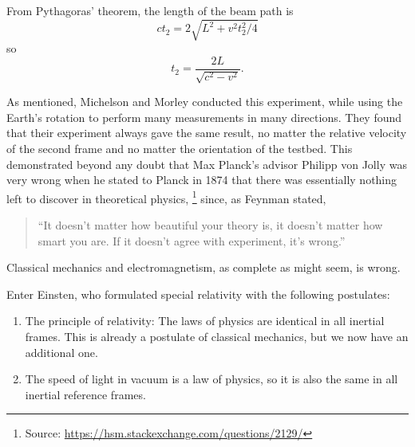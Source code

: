 From Pythagoras' theorem, the length of the beam path is
\[
  c t_2 = 2 \sqrt{L^2 + v^2 t_2^2 / 4}
\]
so
\[
  t_2 = \frac{2 L}{\sqrt{c^2 - v^2}}.
\]

As mentioned, Michelson and Morley conducted this experiment, while using the
Earth's rotation to perform many measurements in many directions.
They found that their experiment always gave the same result, no matter the
relative velocity of the second frame and no matter the orientation of the
testbed.
This demonstrated beyond any doubt that Max Planck's advisor Philipp von Jolly
was very wrong when he stated to Planck in 1874 that there was essentially
nothing left to discover in theoretical physics,%
\footnote{Source: \url{https://hsm.stackexchange.com/questions/2129/}}
since, as Feynman stated,
\begin{quote}
  \enquote{It doesn't matter how beautiful your theory is, it doesn't matter how smart
  you are. If it doesn't agree with experiment, it's wrong.}
\end{quote}
Classical mechanics and electromagnetism, as complete as might seem, is wrong.


Enter Einsten, who formulated special relativity with the following postulates:
\begin{enumerate}
\item The principle of relativity: The laws of physics are identical in all
  inertial frames.
  This is already a postulate of classical mechanics, but we now have an
  additional one.
\item The speed of light in vacuum is a law of physics, so it is also the same
  in all inertial reference frames.
\end{enumerate}

